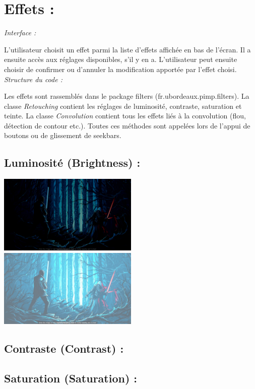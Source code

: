 \section{Effets :}
\emph{Interface :}

L'utilisateur choisit un effet parmi la liste d'effets affichée en bas de l'écran. Il a ensuite accès aux 
réglages disponibles, s'il y en a. L'utilisateur peut ensuite choisir de confirmer ou d'annuler la modification
apportée par l'effet choisi.
\\

\emph{Structure du code :}

Les effets sont rassemblés dans le package filters (fr.ubordeaux.pimp.filters).
La classe \emph{Retouching} contient les réglages de luminosité, contraste, saturation et teinte.
La classe \emph{Convolution} contient tous les effets liés à la convolution (flou, détection de contour etc.).
Toutes ces méthodes sont appelées lors de l'appui de boutons ou de glissement de seekbars.
\subsection{Luminosité (Brightness) :}
\includegraphics[width=0.5\textwidth]{report_src/brightness_low.jpeg}
\includegraphics[width=0.5\textwidth]{report_src/brightness_high.jpeg}

\subsection{Contraste (Contrast) :}
\subsection{Saturation (Saturation) :}